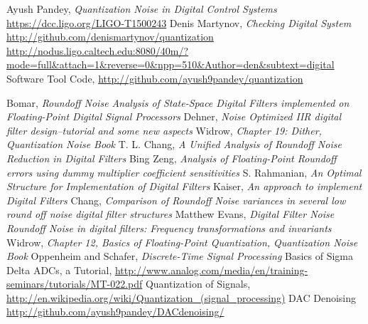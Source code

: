 \documentclass[colorlinks=true,pdfstartview=FitV,linkcolor=blue,
            citecolor=red,urlcolor=magenta]{ligodoc}
\begin{document}
\begin{thebibliography}{20}
 Ayush Pandey, \emph{Quantization Noise in Digital Control Systems} \url{https://dcc.ligo.org/LIGO-T1500243}
 Denis Martynov, \emph{Checking Digital System} \url{http://github.com/denismartynov/quantization}
\url{http://nodus.ligo.caltech.edu:8080/40m/?mode=full&attach=1&reverse=0&npp=510&Author=den&subtext=digital}  
 Software Tool Code, \url{http://github.com/ayush9pandey/quantization}

 Bomar, \emph{Roundoff Noise Analysis of State-Space Digital Filters implemented on Floating-Point Digital Signal Processors}
 Dehner, \emph{Noise Optimized IIR digital filter design--tutorial and some new aspects}
 Widrow, \emph{Chapter 19: Dither, Quantization Noise Book}
 T. L. Chang, \emph{A Unified Analysis of Roundoff Noise Reduction in Digital Filters}
 Bing Zeng, \emph{Analysis of Floating-Point Roundoff errors using dummy multiplier coefficient sensitivities}
 S. Rahmanian, \emph{An Optimal Structure for Implementation of Digital Filters}
 Kaiser, \emph{An approach to implement Digital Filters}
 Chang, \emph{Comparison of Roundoff Noise variances in several low round off noise digital filter structures}
 Matthew Evans, \emph{Digital Filter Noise}
 \emph{Roundoff Noise in digital filters: Frequency transformations and invariants}
 Widrow, \emph{Chapter 12, Basics of Floating-Point Quantization, Quantization Noise Book}
 Oppenheim and Schafer, \emph{Discrete-Time Signal Processing}
 Basics of Sigma Delta ADCs, a Tutorial, \url{http://www.analog.com/media/en/training-seminars/tutorials/MT-022.pdf}
 Quantization of Signals, \url{http://en.wikipedia.org/wiki/Quantization_(signal_processing)}
 DAC Denoising \url{http://github.com/ayush9pandey/DACdenoising/}

\end{thebibliography}        
\end{document}

